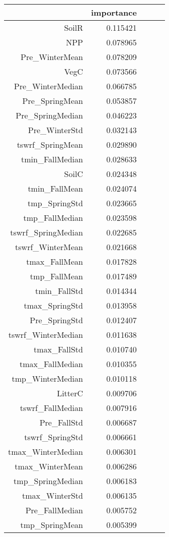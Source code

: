 \begin{table}[h]
\centering
\label{table:5}
\begin{tabular}{rrrrr}
\toprule
 & importance \\
\midrule
SoilR & 0.115421 \\
NPP & 0.078965 \\
Pre_WinterMean & 0.078209 \\
VegC & 0.073566 \\
Pre_WinterMedian & 0.066785 \\
Pre_SpringMean & 0.053857 \\
Pre_SpringMedian & 0.046223 \\
Pre_WinterStd & 0.032143 \\
tswrf_SpringMean & 0.029890 \\
tmin_FallMedian & 0.028633 \\
SoilC & 0.024348 \\
tmin_FallMean & 0.024074 \\
tmp_SpringStd & 0.023665 \\
tmp_FallMedian & 0.023598 \\
tswrf_SpringMedian & 0.022685 \\
tswrf_WinterMean & 0.021668 \\
tmax_FallMean & 0.017828 \\
tmp_FallMean & 0.017489 \\
tmin_FallStd & 0.014344 \\
tmax_SpringStd & 0.013958 \\
Pre_SpringStd & 0.012407 \\
tswrf_WinterMedian & 0.011638 \\
tmax_FallStd & 0.010740 \\
tmax_FallMedian & 0.010355 \\
tmp_WinterMedian & 0.010118 \\
LitterC & 0.009706 \\
tswrf_FallMedian & 0.007916 \\
Pre_FallStd & 0.006687 \\
tswrf_SpringStd & 0.006661 \\
tmax_WinterMedian & 0.006301 \\
tmax_WinterMean & 0.006286 \\
tmp_SpringMedian & 0.006183 \\
tmax_WinterStd & 0.006135 \\
Pre_FallMedian & 0.005752 \\
tmp_SpringMean & 0.005399 \\

\end{tabular}
\end{table}
